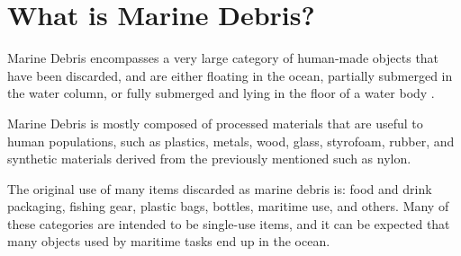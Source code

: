 \FloatBarrier
\section{What is Marine Debris?}

Marine Debris encompasses a very large category of human-made objects that have been discarded, and are either floating in the ocean, partially submerged in the water column, or fully submerged and lying in the floor of a water body . 

Marine Debris is mostly composed of processed materials \cite[-3em]{weis2015marine} that are useful to human populations, such as plastics, metals, wood, glass, styrofoam, rubber, and synthetic materials derived from the previously mentioned such as nylon. 

The original use of many items discarded as marine debris is: food and drink packaging, fishing gear, plastic bags, bottles, maritime use, and others. Many of these categories are intended to be single-use items, and it can be expected that many objects used by maritime tasks end up in the ocean.

